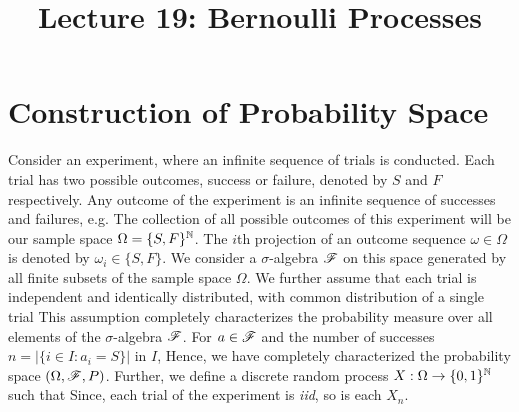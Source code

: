 \documentclass[a4paper,10pt,english]{article}
\title{Lecture 19: Bernoulli Processes}
\author{}
\begin{document}
\maketitle

\section{Construction of Probability Space}
Consider an experiment, where an infinite sequence of trials is conducted. 
Each trial has two possible outcomes, success or failure, denoted by $S$ and $F$ respectively.
Any outcome of the experiment is an infinite sequence of successes and failures, e.g.
The collection of all possible outcomes of this experiment will be our sample space $\Omega = \{S,F\}^{\mathbb{N}}$. 
The $i$th projection of an outcome sequence $\omega \in \Omega$ is denoted by $\omega_i \in \{S,F\}$. 
We consider a $\sigma$-algebra $\mathscr{F}$ on this space generated by all finite subsets of the sample space $\Omega$. 
We further assume that each trial is independent and identically distributed, with common distribution of a single trial 
This assumption completely characterizes the probability measure over all elements of the $\sigma$-algebra $\mathscr{F}$. 
For $a \in \mathscr{F}$ and the number of successes $n = |\{i \in I: a_i = S\}|$ in $I$, 
Hence, we have completely characterized the probability space $(\Omega, \mathscr{F}, P)$. 
Further, we define a discrete random process $X : \Omega \to \{0,1\}^{\mathbb{N}}$ such that 
Since, each trial of the experiment is \emph{iid}, so is each $X_n$. 
\end{document}
